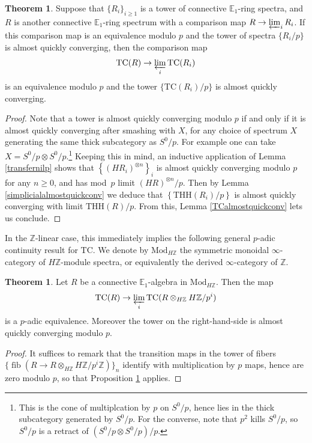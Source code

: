 \documentclass{amsart}
\newcommand{\THH}{\mathrm{THH}}
\renewcommand{\mod}{\mathrm{Mod}}
\theoremstyle{definition}
\newtheorem{theorem}[definition]{Theorem}
\newcommand{\TC}{\mathrm{TC}}
\begin{document}
\begin{theorem} 
\label{THHmodp}
Suppose that $\{R_i\}_{i\ge1}$ is a tower of connective $\mathbb{E}_1$-ring
spectra, and $R$ is another connective $\mathbb{E}_1$-ring spectrum with a
comparison map $R\rightarrow \varprojlim_i R_i$.  If this comparison map is an equivalence modulo $p$ and the tower of spectra $\{R_i/p\}$ is almost quickly converging, then the comparison map
$$\TC(R)\rightarrow\varprojlim_i \TC(R_i)$$
is an equivalence modulo $p$ and the tower $\{\TC(R_i)/p\}$ is almost quickly converging.
\end{theorem} 
\begin{proof} 
Note that a tower is almost quickly converging modulo $p$ if and only if it is almost quickly converging after smashing with $X$, for any choice of spectrum $X$ generating the same thick subcategory as $S^0/p$.  For example one can take $X=S^0/p\otimes S^0/p$.\footnote{This is the cone of multiplcation by $p$ on $S^0/p$, hence lies in the thick subcategory generated by $S^0/p$.  For the converse, note that $p^2$ kills $S^0/p$, so $S^0/p$ is a retract of $(S^0/p \otimes S^0/p)/p$.}  Keeping this in mind, an inductive application of Lemma \ref{transfernilp} shows that $\left\{(HR_i)^{\otimes n}\right\}_i$ is almost quickly converging modulo $p$ for any $n\geq 0$, and has mod~$p$ limit $(HR)^{\otimes n}/p$.  Then by Lemma \ref{simplicialalmostquickconv} we deduce that $\left\{\THH(R_i)/p\right\}$ is almost quickly converging with limit $\THH(R)/p$.  From this, Lemma \ref{TCalmostquickconv} lets us conclude.
\end{proof} 
In the $\mathbb{Z}$-linear case, this immediately implies the following
general $p$-adic continuity result for $\TC$. We denote by $\mod_{H\mathbb{Z}}$ the symmetric monoidal $\infty$-category of $H\mathbb{Z}$-module spectra, or equivalently the derived $\infty$-category of $\mathbb{Z}$. 

\begin{theorem}
\label{TCderpcontinuous}
Let $R$ be a connective
$\mathbb{E}_1$-algebra in $\mod_{H\mathbb{Z}}$.
Then the map 
\[   \TC(R) \to \varprojlim_i \TC( R \otimes_{H\mathbb{Z}} H\mathbb{Z}/p^i) \]
is a $p$-adic equivalence. 
Moreover the tower on the right-hand-side is almost quickly
converging modulo $p$.
\end{theorem}
\begin{proof}
It suffices to remark that the transition maps in the tower of fibers
$\{\operatorname{fib}(R\rightarrow R\otimes_{H\mathbb{Z}} H\mathbb{Z}/p^i\mathbb{Z})\}_n$ identify with multiplication by $p$ maps, hence are zero modulo $p$, so that Proposition \ref{THHmodp} applies.
\end{proof}
\end{document}
